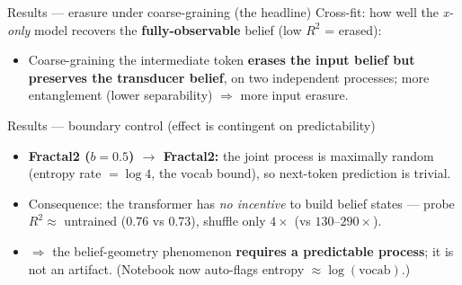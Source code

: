 \documentclass[aspectratio=169]{beamer}
\begin{document}
\begin{frame}{Results --- erasure under coarse-graining (the headline)}
Cross-fit: how well the \emph{x-only} model recovers the \textbf{fully-observable} belief
(low $R^2$ = erased):
\vspace{1mm}
\centering
{}
\vspace{2mm}
\begin{itemize}
  \item Coarse-graining the intermediate token \textbf{erases the input belief but preserves the
        transducer belief}, on two independent processes; more entanglement (lower separability)
        $\Rightarrow$ more input erasure.
\end{itemize}
\end{frame}

\begin{frame}{Results --- boundary control (effect is contingent on predictability)}
\begin{itemize}
  \item \textbf{Fractal2 ($b{=}0.5$) $\to$ Fractal2:} the joint process is maximally random
        (entropy rate $=\log 4$, the vocab bound), so next-token prediction is trivial.
  \item Consequence: the transformer has \emph{no incentive} to build belief states ---
        probe $R^2 \approx$ untrained ($0.76$ vs $0.73$), shuffle only $4\times$ (vs $130$--$290\times$).
  \item $\Rightarrow$ the belief-geometry phenomenon \textbf{requires a predictable process};
        it is not an artifact. (Notebook now auto-flags entropy $\approx \log(\text{vocab})$.)
\end{itemize}
\end{frame}
\end{document}
